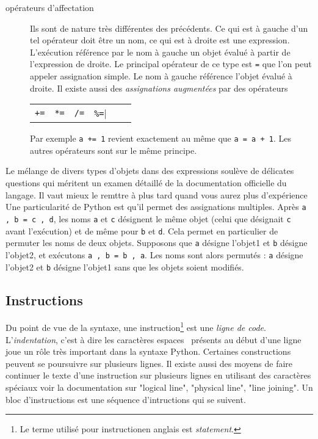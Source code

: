 \begin{description}
\item[opérateurs d'affectation] Ils sont de nature très différentes des précédents. Ce qui est à gauche d'un tel opérateur doit être un nom, ce qui est à droite est une expression. L'exécution référence par le nom à gauche un objet évalué à partir de l'expression de droite.\newline
Le principal opérateur de ce type est \verb|=| que l'on peut appeler assignation simple. Le nom à gauche référence l'objet évalué à droite.\newline
Il existe aussi des \emph{assignations augmentées} par des opérateurs
\begin{center}
\begin{tabular}{cccccc}
\verb|+=|  & \verb|*=| & \verb|/=|  & \verb|%=|
 \end{tabular}
 \end{center}
Par exemple \verb|a += 1| revient exactement au même que \verb|a = a + 1|. Les autres opérateurs sont sur le même principe.
\end{description}
Le mélange de divers types d'objets dans des expressions soulève de délicates questions qui méritent un examen détaillé de la documentation officielle du langage. Il vaut mieux le remttre à plus tard quand vous aurez plus d'expérience\newline
Une particularité de Python est qu'il permet des assignations multiples.\newline
Après \verb|a , b = c , d|, les noms \verb|a| et \verb|c| désignent le même objet (celui que désignait \verb|c| avant l'exécution) et de même pour \verb|b| et \verb|d|. Cela permet en particulier de permuter les noms de deux objets.\newline
Supposons que \verb|a| désigne l'objet1 et \verb|b| désigne l'objet2, et exécutons \verb|a , b = b , a|. Les noms sont alors permutés : \verb|a| désigne l'objet2 et \verb|b| désigne l'objet1 sans que les objets soient modifiés.

\subsection{Instructions}
Du point de vue de la syntaxe, une instruction\footnote{Le terme utilisé pour \og instruction\fg en anglais est \emph{statement}.} est une \emph{ligne de code}.\newline
L'\emph{indentation}, c'est à dire les caractères \og espaces\fg~ présents au début d'une ligne joue un rôle très important dans la syntaxe Python.\newline
Certaines constructions peuvent se poursuivre sur plusieurs lignes. Il existe aussi des moyens de faire continuer le texte d'une instruction sur plusieurs lignes en utilisant des caractères spéciaux voir la documentation sur "logical line", "physical line", "line joining".\newline
Un bloc d'instructions est une séquence d'intructions qui se suivent.
